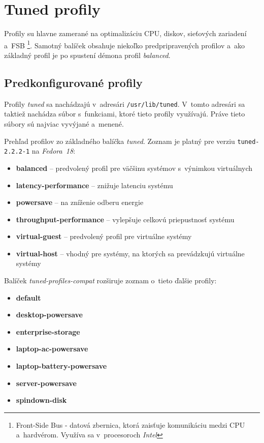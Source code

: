 \section{Tuned profily}
\label{sec:profiles}

Profily su hlavne zamerané na optimalizáciu CPU, diskov, sieťových zariadení
a~FSB \footnote{Front-Side Bus - datová zbernica, ktorá zaisťuje komunikáciu
medzi CPU a~hardvérom. Využíva sa v~procesoroch \emph{Intel}}. Samotný balíček
obsahuje niekoľko predpripravených profilov a~ako základný profil je po spustení
démona profil \emph{balanced}.

%
%

\subsection{Predkonfigurované profily}
\label{sec:prehladProfilov}

Profily \emph{tuned} sa nachádzajú v~adresári \texttt{/usr/lib/tuned}. V~tomto
adresári sa taktiež nachádza súbor s~funkciami, ktoré tieto profily využívajú.
Práve tieto súbory sú najviac vyvýjané a~menené.

Prehľad profilov zo základného balíčka \emph{tuned}. Zoznam je platný pre
verziu \texttt{tuned-2.2.2-1} na \emph{Fedora~18}:

\begin{itemize}
    \item \textbf{balanced} -- predvolený profil pre väčšinu systémov s~výnimkou virtuálnych
    \item \textbf{latency-performance} -- znižuje latenciu systému
    \item \textbf{powersave} -- na zníženie odberu energie
    \item \textbf{throughput-performance} -- vylepšuje celkovú priepustnosť systému 
    \item \textbf{virtual-guest} -- predvolený profil pre virtuálne systémy
    \item \textbf{virtual-host} -- vhodný pre systémy, na ktorých sa prevádzkujú virtuálne systémy
\end{itemize}

Balíček \emph{tuned-profiles-compat} rozširuje zoznam o~tieto ďalšie profily:

\begin{itemize}
    \item \textbf{default}
    \item \textbf{desktop-powersave}
    \item \textbf{enterprise-storage}
    \item \textbf{laptop-ac-powersave}
    \item \textbf{laptop-battery-powersave}
    \item \textbf{server-powersave}
    \item \textbf{spindown-disk}
\end{itemize}

